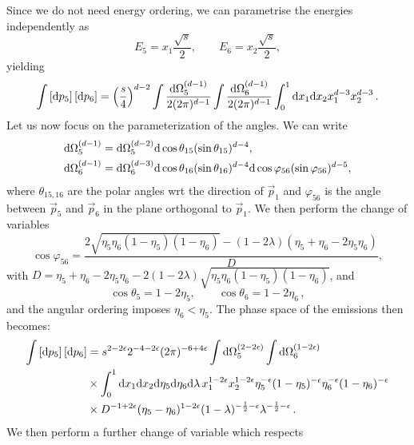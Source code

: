 \documentclass[a4paper,11pt]{article}
\begin{document}
Since we do not need energy ordering, 
we can parametrise the energies independently as 
\begin{equation}
E_5 = x_1 \frac{\sqrt{s}}{2}, \quad\quad
E_6 = x_2 \frac{\sqrt{s}}{2},
\end{equation}
yielding
\begin{equation}
\int \left[ \mathrm d p_5\right] \left[ \mathrm d p_6\right]= 
\left(\frac{s}{4}\right)^{d-2}
\int\frac{\mathrm d \Omega^{(d-1)}_5}{2(2\pi)^{d-1}}
\int\frac{\mathrm d \Omega^{(d-1)}_6}{2(2\pi)^{d-1}}
\int^1_0\mathrm d x_1 \mathrm d x_2 x_1^{d-3} x_2^{d-3}\,.
\end{equation}
Let us now focus on the parameterization of the angles. We can write
\begin{align}
\mathrm d \Omega^{(d-1)}_5 &= \mathrm d \Omega^{(d-2)}_5 \mathrm d\cos\theta_{15} (\sin\theta_{15})^{d-4},\\
\mathrm d \Omega^{(d-1)}_6 &= \mathrm d \Omega^{(d-3)}_6 \mathrm d\cos\theta_{16} (\sin\theta_{16})^{d-4}\mathrm d\cos\varphi_{56}(\sin\varphi_{56})^{d-5},
\end{align}
where $\theta_{15,16}$ are the polar angles wrt the direction of 
$\vec{p}_1$ and
$\varphi_{56}$ is the angle between $\vec{p}_5$ and $\vec{p}_6$ in the plane
orthogonal to $\vec{p}_1$.
We then perform the change of variables
\begin{equation}
\cos\varphi_{56} = \frac{2\sqrt{\eta_5\eta_6(1-\eta_5)(1-\eta_6)}-
(1-2\lambda)(\eta_5 + \eta_6 - 2\eta_5 \eta_6)}{D},
\end{equation}
with 
$D = \eta_5 + \eta_6 - 2\eta_5 \eta_6 - 2(1-2\lambda)\sqrt{\eta_5\eta_6(1-\eta_5)(1-\eta_6)}$, and
\begin{equation}
\cos\theta_5 = 1 -2 \eta_5, \quad\quad
\cos\theta_6 = 1-2 \eta_6\,,
\end{equation}
and the angular ordering imposes $\eta_6 < \eta_5$. 
The phase space of the emissions then becomes:
\begin{align}
\int \left[ \mathrm d p_5\right] \left[ \mathrm d p_6\right] &= 
s^{2-2\epsilon} 2^{-4-2\epsilon} (2\pi)^{-6+4\epsilon}
\int\mathrm d \Omega^{(2-2\epsilon)}_5
\int\mathrm d \Omega^{(1-2\epsilon)}_6 \nonumber \\
&\times
\int^1_0\mathrm d x_1 \mathrm d x_2 \mathrm d\eta_5 \mathrm d\eta_6\mathrm d\lambda\,
x_1^{1-2\epsilon} x_2^{1-2\epsilon}
\eta_5^{-\epsilon} (1-\eta_5)^{-\epsilon}
\eta_6^{-\epsilon} (1-\eta_6)^{-\epsilon} \nonumber \\
&\times
D^{-1+2\epsilon}(\eta_5-\eta_6)^{1-2\epsilon}
(1-\lambda)^{-\frac{1}{2}-\epsilon}\lambda^{-\frac{1}{2}-\epsilon}\,.
\end{align}
We then perform a further change of variable which respects 
\end{document}
